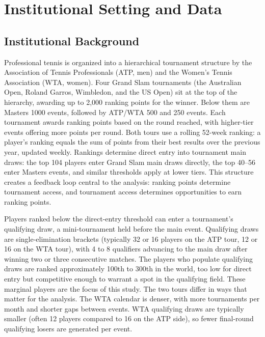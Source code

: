 \section{Institutional Setting and Data}
\label{sec:data}

\subsection{Institutional Background}
\label{sec:data_institutional}

Professional tennis is organized into a hierarchical tournament structure by the Association of Tennis Professionals (ATP, men) and the Women's Tennis Association (WTA, women). Four Grand Slam tournaments (the Australian Open, Roland Garros, Wimbledon, and the US Open) sit at the top of the hierarchy, awarding up to 2,000 ranking points for the winner. Below them are Masters 1000 events, followed by ATP/WTA 500 and 250 events. Each tournament awards ranking points based on the round reached, with higher-tier events offering more points per round. Both tours use a rolling 52-week ranking: a player's ranking equals the sum of points from their best results over the previous year, updated weekly. Rankings determine direct entry into tournament main draws: the top 104 players enter Grand Slam main draws directly, the top 40--56 enter Masters events, and similar thresholds apply at lower tiers. This structure creates a feedback loop central to the analysis: ranking points determine tournament access, and tournament access determines opportunities to earn ranking points.

Players ranked below the direct-entry threshold can enter a tournament's qualifying draw, a mini-tournament held before the main event. Qualifying draws are single-elimination brackets (typically 32 or 16 players on the ATP tour, 12 or 16 on the WTA tour), with 4 to 8 qualifiers advancing to the main draw after winning two or three consecutive matches. The players who populate qualifying draws are ranked approximately 100th to 300th in the world, too low for direct entry but competitive enough to warrant a spot in the qualifying field. These marginal players are the focus of this study. The two tours differ in ways that matter for the analysis. The WTA calendar is denser, with more tournaments per month and shorter gaps between events. WTA qualifying draws are typically smaller (often 12 players compared to 16 on the ATP side), so fewer final-round qualifying losers are generated per event.

